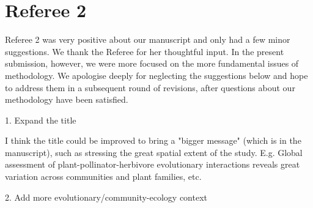 \documentclass[12pt]{letter}
\newenvironment{refquote}{\bigskip \begin{it}}{\end{it}\smallskip}
\begin{document}
\clearpage


\section*{Referee 2}

  Referee 2 was very positive about our manuscript and only had a few minor suggestions. We thank the Referee for her thoughtful input. In the present submission, however, we were more focused on the more fundamental issues of methodology. We apologise deeply for neglecting the suggestions below and hope to address them in a subsequent round of revisions, after questions about our methodology have been satisfied.


  1. Expand the title

    \begin{refquote}

      I think the title could be improved to bring a "bigger message" (which is in the manuscript), such as stressing the great spatial extent of the study. E.g. Global assessment of plant-pollinator-herbivore evolutionary interactions reveals great variation across communities and plant families, etc.

    \end{refquote}



  2. Add more evolutionary/community-ecology context
\end{document}
